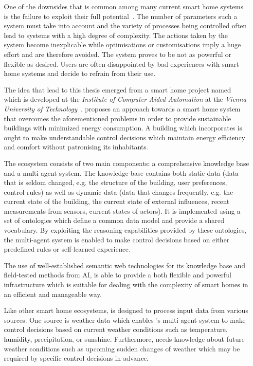 One of the downsides that is common among many current smart home systems is the failure to exploit their full potential~\cite{HomeAutomationChallengesOpportunities,HomeMaestro,StateOfHomeNetworking}. The number of parameters such a system must take into account and the variety of processes being controlled often lead to systems with a high degree of complexity. The actions taken by the system become inexplicable while optimisations or customisations imply a huge effort and are therefore avoided. The system proves to be not as powerful or flexible as desired. Users are often disappointed by bad experiences with smart home systems and decide to refrain from their use.

The idea that lead to this thesis emerged from a smart home project named \thinkhome~\cite{ThinkHomeWeb} which is developed at the \emph{Institute of Computer Aided Automation} at the \emph{Vienna University of Technology}~\cite{CR2011-TH_Journal,CR2010-DEST_ThinkHome}. \thinkhome proposes an approach towards a smart home system that overcomes the aforementioned problems in order to provide sustainable buildings with minimized energy consumption. A building which incorporates \thinkhome is ought to make understandable control decisions which maintain energy efficiency and comfort without patronising its inhabitants.

The \thinkhome ecosystem consists of two main components: a comprehensive knowledge base and a multi-agent system. The knowledge base contains both static data (data that is seldom changed, e.g. the structure of the building, user preferences, control rules) as well as dynamic data (data that changes frequently, e.g. the current state of the building, the current state of external influences, recent measurements from sensors, current states of actors). It is implemented using a set of ontologies which define a common data model and provide a shared vocabulary. By exploiting the reasoning capabilities provided by these ontologies, the multi-agent system is enabled to make control decisions based on either predefined rules or self-learned experience.

The use of well-established semantic web technologies for its knowledge base and field-tested methods from AI, \thinkhome is able to provide a both flexible and powerful infrastructure which is suitable for dealing with the complexity of smart homes in an efficient and manageable way.

Like other smart home ecosystems, \thinkhome is designed to process input data from various sources. One source is weather data which enables \thinkhome's multi-agent system to make control decisions based on current weather conditions such as temperature, humidity, precipitation, or sunshine. Furthermore, \thinkhome needs knowledge about future weather conditions such as upcoming sudden changes of weather which may be required by specific control decisions in advance.

